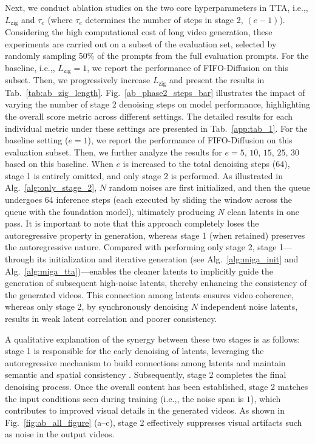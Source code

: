 \documentclass{llmxive}
\providecommand{\ie}{i.e.,\xspace}
\begin{document}
Next, we conduct ablation studies on the two core hyperparameters in TTA, \ie, $L_{\mathrm{zig}}$ and $\tau_e$ (where $\tau_e$ determines the number of steps in stage 2, $(e-1)$).
Considering the high computational cost of long video generation, these experiments are carried out on a subset of the evaluation set, selected by randomly sampling 50\% of the prompts from the full evaluation prompts.
For the baseline, \ie, $L_{\mathrm{zig}}=1$, we report the performance of FIFO-Diffusion on this subset.
Then, we progressively increase $L_{\mathrm{zig}}$ and present the results in Tab.~\ref{tab:ab_zig_length}.
Fig.~\ref{ab_phase2_steps_bar} illustrates the impact of varying the number of stage 2 denoising steps on model performance, highlighting the overall score metric across different settings. The detailed results for each individual metric under these settings are presented in Tab.~\ref{app:tab_1}.
For the baseline setting ($e=1$), we report the performance of FIFO-Diffusion on this evaluation subset. Then, we further analyze the results for $e=5,\,10,\,15,\,25,\,30$ based on this baseline. When $e$ is increased to the total denoising steps ($64$), stage 1 is entirely omitted, and only stage 2 is performed. 
As illustrated in Alg.~\ref{alg:only_stage_2}, $N$ random noises are first initialized, and then the queue undergoes $64$ inference steps (each executed by sliding the window across the queue with the foundation model), ultimately producing $N$ clean latents in one pass. 
It is important to note that this approach completely loses the autoregressive property in generation, whereas stage 1 (when retained) preserves the autoregressive nature. Compared with performing only stage 2, stage 1—through its initialization and iterative generation (see Alg.~\ref{alg:miga_init} and Alg.~\ref{alg:miga_tta})—enables the cleaner latents to implicitly guide the generation of subsequent high-noise latents, thereby enhancing the consistency of the generated videos. This connection among latents ensures video coherence, whereas only stage 2, by synchronously denoising $N$ independent noise latents, results in weak latent correlation and poorer consistency.

A qualitative explanation of the synergy between these two stages is as follows: stage 1 is responsible for the early denoising of latents, leveraging the autoregressive mechanism to build connections among latents and maintain semantic and spatial consistency \cite{qiu2023freenoise}. Subsequently, stage 2 completes the final denoising process. Once the overall content has been established, stage 2 matches the input conditions seen during training (\ie, the noise span is $1$), which contributes to improved visual details in the generated videos. As shown in Fig.~\ref{fig:ab_all_figure} (a–c), stage 2 effectively suppresses visual artifacts such as noise in the output videos.
\end{document}
